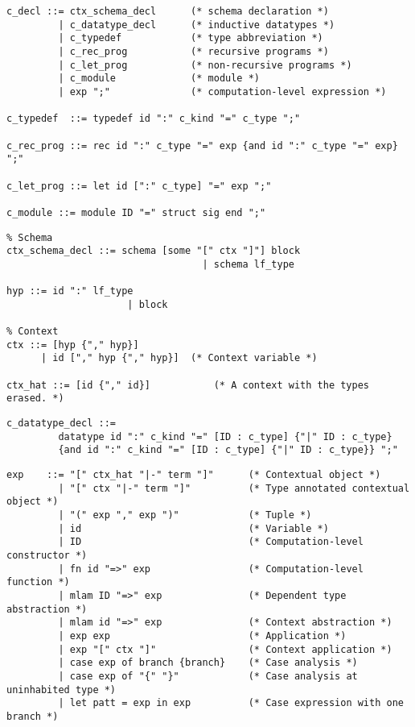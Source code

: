 \documentclass[11pt]{article}
\begin{document}
\begin{verbatim}
c_decl ::= ctx_schema_decl      (* schema declaration *)
         | c_datatype_decl      (* inductive datatypes *)
         | c_typedef            (* type abbreviation *)
         | c_rec_prog           (* recursive programs *)
         | c_let_prog           (* non-recursive programs *)
         | c_module             (* module *)
         | exp ";"              (* computation-level expression *)

c_typedef  ::= typedef id ":" c_kind "=" c_type ";"

c_rec_prog ::= rec id ":" c_type "=" exp {and id ":" c_type "=" exp} ";"

c_let_prog ::= let id [":" c_type] "=" exp ";"

c_module ::= module ID "=" struct sig end ";"
\end{verbatim}

\begin{verbatim}
% Schema
ctx_schema_decl ::= schema [some "[" ctx "]"] block
                                  | schema lf_type

hyp ::= id ":" lf_type
                     | block

% Context
ctx ::= [hyp {"," hyp}]
      | id ["," hyp {"," hyp}]  (* Context variable *)

ctx_hat ::= [id {"," id}]           (* A context with the types erased. *)
\end{verbatim}

\begin{verbatim}
c_datatype_decl ::=
         datatype id ":" c_kind "=" [ID : c_type] {"|" ID : c_type}
         {and id ":" c_kind "=" [ID : c_type] {"|" ID : c_type}} ";"
\end{verbatim}

\begin{verbatim}
exp    ::= "[" ctx_hat "|-" term "]"      (* Contextual object *)
         | "[" ctx "|-" term "]"          (* Type annotated contextual object *)
         | "(" exp "," exp ")"            (* Tuple *)
         | id                             (* Variable *)
         | ID                             (* Computation-level constructor *)
         | fn id "=>" exp                 (* Computation-level function *)
         | mlam ID "=>" exp               (* Dependent type abstraction *)
         | mlam id "=>" exp               (* Context abstraction *)
         | exp exp                        (* Application *)
         | exp "[" ctx "]"                (* Context application *)
         | case exp of branch {branch}    (* Case analysis *)
         | case exp of "{" "}"            (* Case analysis at uninhabited type *)
         | let patt = exp in exp          (* Case expression with one branch *)

\end{verbatim}
\end{document}

